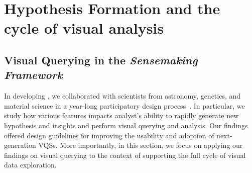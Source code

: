 \section{Hypothesis Formation and the cycle of visual analysis\label{sec:hypothesis}}
\subsection{Visual Querying in the \textit{Sensemaking Framework}}
In developing \zv, we collaborated with scientists from astronomy, genetics, and material science in a year-long participatory design process~\cite{Lee2017}. In particular, we study how various features impacts analyst's ability to rapidly generate new hypothesis and insights and perform visual querying and analysis. Our findings offered design guidelines for improving the usability and adoption of next-generation VQSs. More importantly, in this section, we focus on applying our findings on visual querying to the context of supporting the full cycle of visual data exploration. 
